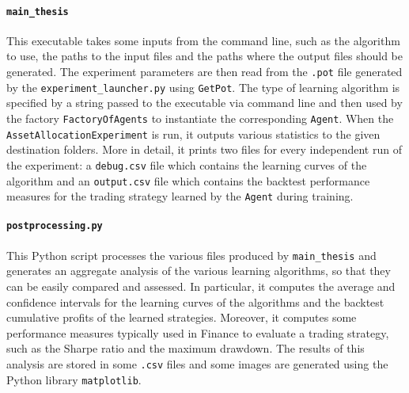 \paragraph{\lstinline{main_thesis}} This executable takes some inputs from the command line, such as the algorithm to use, the paths to the input files and the paths where the output files should be generated. The experiment parameters are then read from the \lstinline{.pot} file generated by the \lstinline{experiment_launcher.py} using \lstinline{GetPot}. The type of learning algorithm is specified by a string passed to the executable via command line and then used by the factory \lstinline{FactoryOfAgents} to instantiate the corresponding \lstinline{Agent}. When the \lstinline{AssetAllocationExperiment} is run, it outputs various statistics to the given destination folders. More in detail, it prints two files for every independent run of the experiment: a \lstinline{debug.csv} file which contains the learning curves of the algorithm and an \lstinline{output.csv} file which contains the backtest performance measures for the trading strategy learned by the \lstinline{Agent} during training.   

\paragraph{\lstinline{postprocessing.py}} This Python script processes the various files produced by \lstinline{main_thesis} and generates an aggregate analysis of the various learning algorithms, so that they can be easily compared and assessed. In particular, it computes the average and confidence intervals for the learning curves of the algorithms and the backtest cumulative profits of the learned strategies. Moreover, it computes some performance measures typically used in Finance to evaluate a trading strategy, such as the Sharpe ratio and the maximum drawdown. The results of this analysis are stored in some \lstinline{.csv} files and some images are generated using the Python library \lstinline{matplotlib}. 


